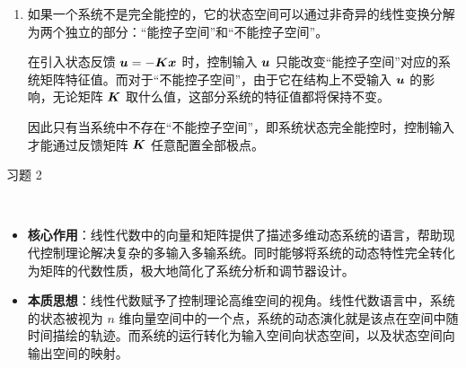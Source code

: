 \begin{problem}
\begin{solution}
\begin{enumerate}
			\item[\textbf{3)}] 如果一个系统不是完全能控的，它的状态空间可以通过非奇异的线性变换分解为两个独立的部分：“能控子空间”和“不能控子空间”。
			
			在引入状态反馈 $\boldsymbol{u} = -\boldsymbol{K} \boldsymbol{x}$ 时，控制输入 $\boldsymbol{u}$ 只能改变“能控子空间”对应的系统矩阵特征值。而对于“不能控子空间”，由于它在结构上不受输入 $\boldsymbol{u}$ 的影响，无论矩阵 $\boldsymbol{K}$ 取什么值，这部分系统的特征值都将保持不变。
			
			因此只有当系统中不存在“不能控子空间”，即系统状态完全能控时，控制输入才能通过反馈矩阵 $\boldsymbol{K}$ 任意配置全部极点。
		\end{enumerate}
	\end{solution}
\end{problem}

\begin{problem}
	习题 2
	\begin{solution}
		\ 
		\begin{itemize}
			\item \textbf{核心作用}：线性代数中的向量和矩阵提供了描述多维动态系统的语言，帮助现代控制理论解决复杂的多输入多输系统。同时能够将系统的动态特性完全转化为矩阵的代数性质，极大地简化了系统分析和调节器设计。
			
			\item \textbf{本质思想}：线性代数赋予了控制理论高维空间的视角。线性代数语言中，系统的状态被视为 $n$ 维向量空间中的一个点，系统的动态演化就是该点在空间中随时间描绘的轨迹。而系统的运行转化为输入空间向状态空间，以及状态空间向输出空间的映射。
		\end{itemize}
	\end{solution}
\end{problem}
